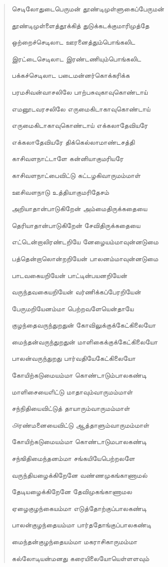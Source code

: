 \documentclass{article}
\begin{document}
\begin{quotation}
{செடிலோதுடைபெருமன் தூண்டிமுள்ளுகைப்பேருமன்

தூண்டிமுள்ளைத்தூக்கித் துடுக்கடக்குமாரிமுத்தே

ஒற்றைச்செடிலாட ஊரனைத்தும்பொங்கலிட

இரட்டைசெடிலாட இரண்டணியும்பொங்கலிட

பக்கச்செடிலாட படைமன்னர்கொக்கரிக்க

பரமசிவன்வாசலிலே பாற்பசுவுகாவுகொண்டாய்

எமனூடவரசலிலே எருமைகிடாகாவுகொண்டாய்

எருமைகிடாகாவுகொண்டாய் எக்கலாதேவியரே

எக்கலாதேவியரே திக்கெல்லாமாண்டசத்தி

காசிவளநாட்டாளே கன்னியாகுமரியரே

காசிவளநாட்பைவிட்டு கட்டழகிவாருமம்மாள்

ஊசிவளநாடு உத்தியாகுமரிதேசம்

அறியாதான்பாடுகிறேன் அம்மைதிருக்கதையை

தெரியாதான்பாடுகிறேன் சேவிதிருக்கதையை

எட்டென்றாலிரண்டறியே னேழையம்மாவுன்னடுமை

பத்தென்றாலொன்றறியேன் பாலனம்மாவுன்னடுமை

பாடவகையறியேன் பாட்டின்பயனறியேன்

வருந்தவகையறியேன் வர்ணிக்கப்பேரறியேன்

பேருமறியேனம்மா பெற்றவளேயென்தாயே

குழந்தைவருந்துறதுன் கோவிலுக்குக்கேட்கிலையோ

மைந்தன்வருந்துறதுன் மாளிகைக்குக்கேட்கிலையோ

பாலன்வருந்துறது பார்வதியேகேட்கிலையோ

கோயிற்கடுமையம்மா கொண்டாடும்பாலகண்டி

மாளிசையைஎிட்டு மாதாவும்வாருமம்மாள்

சந்நிதியைவிட்டுத் தாயாரும்வாருமம்மாள்

௮ரண்மனையைவிட்டு ஆத்தாளும்வாருமம்மாள்

கோயிற்கடுமையம்மா கொண்டாடுமபாலகண்டி

சந்ஙிதிமைந்தனம்மா சங்கயியேபெற்றலளே

வருந்தியழைக்கிறேனே வண்ணமுகங்காணாமல்

தேடியழைக்கிறேனே தேவிமுகங்காணாமல

ஏழைகுழந்கையம்மா எடுத்தோற்குப்பாலகண்டி

பாலன்குழந்தையம்மா பார்ததோங்குப்பாலகண்டி

மைந்தன்குழந்தையம்மா மகராசிகாருமம்மா

கல்லோடியன்மனது கரையிலையோயெள்ளளவும்

}
\end{quotation}
\end{document}
